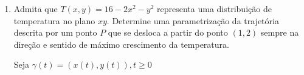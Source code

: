 \documentclass{book}
\begin{document}
\begin{enumerate}
\begin{sol}
Para verificar se $f$ \'e diferenci\'avel em $(0,1)$, fa\c{c}amos

\[
\begin{gathered}
  \mathop {\lim }\limits_{\left( {h,k} \right) \to \left( {0,0} \right)} \frac{{f\left( {\left( {0,1} \right) + \left( {h,k} \right)} \right) - f\left( {0,1} \right) - f_x \left( {0,1} \right)h - f_y \left( {0,1} \right)k}}
{{\left\| {\left( {h,k} \right)} \right\|}} =  \hfill \\
   = \mathop {\lim }\limits_{\left( {h,k} \right) \to \left( {0,0} \right)} \frac{{\frac{{h^2 k}}
{{h^2  + k^2 }} - 0 - 0h - 0k}}
{{\sqrt {h^2  + k^2 } }} =  \hfill \\
   = \mathop {\lim }\limits_{\left( {h,k} \right) \to \left( {0,0} \right)} \frac{{h^2 k}}
{{\left( {h^2  + k^2 } \right)\sqrt {h^2  + k^2 } }} \hfill \\
\end{gathered}
\]

Seja

\[
g\left( {h,k} \right) = \frac{{h^2 k}}
{{\left( {h^2  + k^2 } \right)\sqrt {h^2  + k^2 } }}
\]

ent\~ao

\[
\begin{gathered}
  \gamma _1 \left( t \right) = \left( {t,t} \right) \hfill \\
  \mathop {\lim }\limits_{t \to 0} \left( {g \circ \gamma } \right)\left( t \right) = \mathop {\lim }\limits_{t \to 0} \frac{{t^3 }}
{{2t^2 \left( {2t^2 } \right)^{{\raise0.5ex\hbox{$\scriptstyle 1$}
\kern-0.1em/\kern-0.15em
\lower0.25ex\hbox{$\scriptstyle 2$}}} }} = \mathop {\lim }\limits_{t \to 0} \frac{t}
{{2\sqrt 2 \left| t \right|}} \hfill \\
  \therefore \lim \nexists  \hfill \\
\end{gathered}
\]

\end{sol}

  \item Admita que $T(x,y) = 16-2x^2-y^2$ representa uma distribui\c{c}\~ao de temperatura no plano $xy$. Determine uma parametriza\c{c}\~ao da trajet\'oria descrita por um ponto $P$ que se desloca a partir do ponto $(1,2)$ sempre na dire\c{c}\~ao e sentido de m\'aximo crescimento da temperatura.

\begin{sol}
Seja $\gamma \left( t \right) = \left( {x\left( t \right),y\left( t \right)} \right),t \geqslant 0$


\end{sol}
\end{enumerate}
\end{document}

